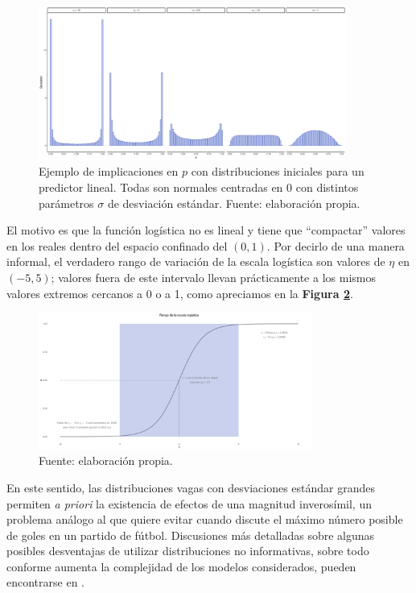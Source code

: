 \begin{figure}[h]
	\centering
	\includegraphics[width = 0.9\textwidth]{Figs/Modelado/Malas_Iniciales}
	\caption{Ejemplo de implicaciones en $p$ con distribuciones iniciales para un predictor lineal. Todas son normales centradas en $0$ con distintos parámetros $\sigma$ de desviación estándar. Fuente: elaboración propia.}
	\label{fig:Malas_Iniciales}
\end{figure}

El motivo es que la función logística no es lineal y tiene que ``compactar'' valores en los reales dentro del espacio confinado del $\left(0,1\right)$. Por decirlo de una manera informal, el verdadero rango de variación de la escala logística son valores de $\eta$ en $(-5,5)$; valores fuera de este intervalo llevan prácticamente a los mismos valores extremos cercanos a 0 o a 1, como apreciamos en la \textbf{Figura \ref{fig:Escala_Logis}}.\\

\begin{figure}[h]
	\centering
	\includegraphics[width = 0.8\textwidth]{Figs/Modelado/Escala_Logis}
	\caption{Fuente: elaboración propia.}
	\label{fig:Escala_Logis}
\end{figure}

En este sentido, las distribuciones vagas con desviaciones estándar grandes permiten \textit{a priori} la existencia de efectos de una magnitud inverosímil, un problema análogo al que \textcite{Regueiro12} quiere evitar cuando discute el máximo número posible de goles en un partido de fútbol. Discusiones más detalladas sobre algunas posibles desventajas de utilizar distribuciones no informativas, sobre todo conforme aumenta la complejidad de los modelos considerados, pueden encontrarse en \textcites{PriorLikelihood17}{BetancourtStanShapePriors}{BlogSimpson}.\\

